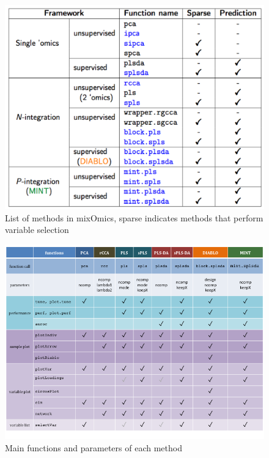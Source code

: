 \documentclass[]{book}
\theoremstyle{definition}
\theoremstyle{definition}
\theoremstyle{definition}
\theoremstyle{remark}
\begin{document}
\begin{figure}

{\centering \includegraphics[width=1\linewidth]{XtraFigs/Methods} 

}

\caption{List of methods in mixOmics, sparse indicates methods that perform variable selection}\label{fig:methods}
\end{figure}

\begin{figure}

{\centering \includegraphics[width=1\linewidth]{XtraFigs/cheatsheet} 

}

\caption{Main functions and parameters of each method}\label{fig:cheatsheet}
\end{figure}
\end{document}
